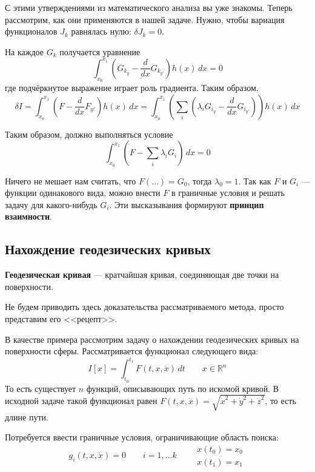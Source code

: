 \documentclass[12pt]{article}
\begin{document}
	С этими утверждениями из математического анализа вы уже знакомы. Теперь рассмотрим, как они применяются в 
	нашей задаче. Нужно, чтобы вариация функционалов $J_k$ равнялась нулю: $\delta J_k = 0$.

	На каждое $G_k$ получается уравнение
	$$\int_{x_0}^{x_1} \left(\underline{G_{k_y} - \frac{d}{dx}G_{k_{y'}}}\right) h(x)\,dx = 0$$	
	где подчёркнутое выражение играет роль градиента. Таким образом,
	$$\delta I = \int_{x_0}^{x_1} \left(F - \frac{d}{dx}F_{y'}\right)h(x) \,dx 
	  = \int_{x_0}^{x_1} \left(\sum_i \left(\lambda_i G_{i_y} - \frac{d}{dx}G_{i_{y'}} \right)\right)h(x) \,dx$$
	  
	Таким образом, должно выполняться условие
	$$\int_{x_0}^{x_1} \left(F - \sum_i \lambda_i G_i\right) \,dx = 0$$

	Ничего не мешает нам считать, что $F(\ldots) = G_0$, тогда $\lambda_0 = 1$. Так как 
	$F$ и $G_i$ --- функции одинакового вида, можно внести $F$ в граничные условия и решать
	задачу для какого-нибудь $G_i$. Эти высказывания формируют \textbf{принцип взаимности}.


	\subsection{Нахождение геодезических кривых}

	\begin{defi}
		\textbf{Геодезическая кривая} --- кратчайшая кривая, соединяющая две точки на поверхности.
	\end{defi}

	Не будем приводить здесь доказательства рассматриваемого метода, просто представим его <<рецепт>>.

	В качестве примера рассмотрим задачу о нахождении геодезических кривых на поверхности сферы.
	Рассматривается функционал следующего вида:
	$$I[x] = \int_{t_0}^{t_1} F(t,x,\dot{x})\,dt \qquad x \in \mathbb{R}^n$$
	То есть существует $n$ функций, описывающих путь по искомой кривой. В исходной задаче такой
	функционал равен $F(t,x,\dot{x}) = \sqrt{\dot{x}^2 + \dot{y}^2 + \dot{z}^2}$, то есть длине
	пути.

	Потребуется ввести граничные условия, ограничивающие область поиска:
	\begin{equation} \label{eq:GeodSurface}
		g_i(t, x, \dot{x}) = 0 \qquad i = 1,\ldots k \qquad
		\begin{aligned}
			x(t_0) = x_0 \\
			x(t_1) = x_1
		\end{aligned}
	\end{equation}
\end{document}
